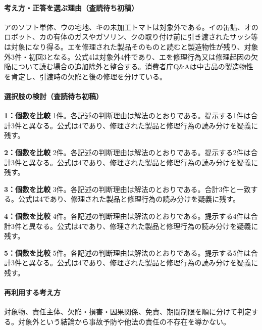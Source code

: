 \paragraph{考え方・正答を選ぶ理由（査読待ち初稿）} アのソフト単体、ウの宅地、キの未加工トマトは対象外である。イの缶詰、オのロボット、カの有体のガスやガソリン、クの取り付け前に引き渡されたサッシ等は対象になり得る。エを修理された製品そのものと読むと製造物性が残り、対象外3件・初回3となる。公式4は対象外4件であり、エを修理行為又は修理起因の欠陥について読む場合の追加除外と整合する。消費者庁Q\&Aは中古品の製造物性を肯定し、引渡時の欠陥と後の修理を分けている。

\paragraph{選択肢の検討（査読待ち初稿）}\mbox{}\par

\noindent\textbf{1：個数を比較} 1件。各記述の判断理由は解法のとおりである。提示する1件は合計3件と異なる。公式は4であり、修理された製品と修理行為の読み分けを疑義に残す。\par

\noindent\textbf{2：個数を比較} 2件。各記述の判断理由は解法のとおりである。提示する2件は合計3件と異なる。公式は4であり、修理された製品と修理行為の読み分けを疑義に残す。\par

\noindent\textbf{3：個数を比較} 3件。各記述の判断理由は解法のとおりである。合計3件と一致する。公式は4であり、修理された製品と修理行為の読み分けを疑義に残す。\par

\noindent\textbf{4：個数を比較} 4件。各記述の判断理由は解法のとおりである。提示する4件は合計3件と異なる。公式は4であり、修理された製品と修理行為の読み分けを疑義に残す。\par

\noindent\textbf{5：個数を比較} 5件。各記述の判断理由は解法のとおりである。提示する5件は合計3件と異なる。公式は4であり、修理された製品と修理行為の読み分けを疑義に残す。\par

\paragraph{再利用する考え方} 対象物、責任主体、欠陥・損害・因果関係、免責、期間制限を順に分けて判定する。対象外という結論から事故予防や他法の責任の不存在を導かない。

